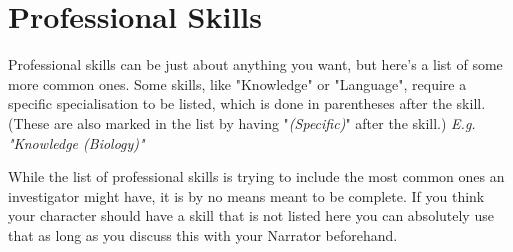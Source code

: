 \section{Professional Skills}
Professional skills can be just about anything you want, 
but here's a list of some more common ones.
Some skills, like "Knowledge" or "Language", require a specific specialisation to be listed,
which is done in parentheses after the skill.
(These are also marked in the list by having "\textit{(Specific)}" after the skill.)
\textit{E.g. "Knowledge (Biology)"}

While the list of professional skills is trying to include the most common ones an investigator might have,
it is by no means meant to be complete.
If you think your character should have a skill that is not listed here
you can absolutely use that as long as you discuss this with your Narrator beforehand.

